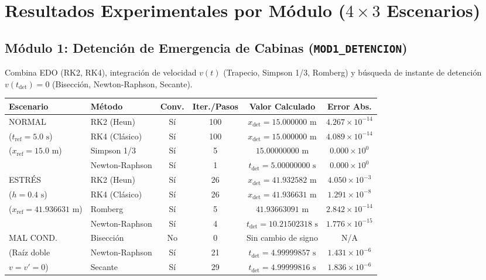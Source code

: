 \documentclass[11pt,a4paper]{article}
\begin{document}
\section{Resultados Experimentales por Módulo ($4 \times 3$ Escenarios)}

\subsection{Módulo 1: Detención de Emergencia de Cabinas (\texttt{MOD1\_DETENCION})}
Combina EDO (RK2, RK4), integración de velocidad $v(t)$ (Trapecio, Simpson 1/3, Romberg) y búsqueda de instante de detención $v(t_{\text{det}})=0$ (Bisección, Newton-Raphson, Secante).

\begin{table}[h!]
\centering
\small
\begin{tabular}{llcccc}
\toprule
\textbf{Escenario} & \textbf{Método} & \textbf{Conv.} & \textbf{Iter./Pasos} & \textbf{Valor Calculado} & \textbf{Error Abs.} \\
\midrule
NORMAL & RK2 (Heun) & Sí & 100 & $x_{\text{det}}=15.000000\text{ m}$ & $4.267\times 10^{-14}$ \\
($t_{\text{ref}}=5.0\text{ s}$) & RK4 (Clásico) & Sí & 100 & $x_{\text{det}}=15.000000\text{ m}$ & $4.089\times 10^{-14}$ \\
($x_{\text{ref}}=15.0\text{ m}$) & Simpson 1/3 & Sí & 5 & $15.00000000\text{ m}$ & $0.000\times 10^{0}$ \\
 & Newton-Raphson & Sí & 1 & $t_{\text{det}}=5.00000000\text{ s}$ & $0.000\times 10^{0}$ \\
\midrule
ESTRÉS & RK2 (Heun) & Sí & 26 & $x_{\text{det}}=41.932582\text{ m}$ & $4.050\times 10^{-3}$ \\
($h=0.4\text{ s}$) & RK4 (Clásico) & Sí & 26 & $x_{\text{det}}=41.936631\text{ m}$ & $1.291\times 10^{-8}$ \\
($x_{\text{ref}}=41.936631\text{ m}$) & Romberg & Sí & 5 & $41.93663091\text{ m}$ & $2.842\times 10^{-14}$ \\
 & Newton-Raphson & Sí & 4 & $t_{\text{det}}=10.21502318\text{ s}$ & $1.776\times 10^{-15}$ \\
\midrule
MAL COND. & Bisección & No & 0 & Sin cambio de signo & N/A \\
(Raíz doble & Newton-Raphson & Sí & 21 & $t_{\text{det}}=4.99999857\text{ s}$ & $1.431\times 10^{-6}$ \\
$v=v'=0$) & Secante & Sí & 29 & $t_{\text{det}}=4.99999816\text{ s}$ & $1.836\times 10^{-6}$ \\
\bottomrule
\end{tabular}
\end{table}
\end{document}
